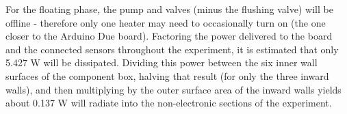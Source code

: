 For the floating phase, the pump and valves (minus the flushing valve) will be offline - therefore only one heater may need to occasionally turn on (the one closer to the Arduino Due board). Factoring the power delivered to the board and the connected sensors throughout the experiment, it is estimated that only 5.427 W will be dissipated. Dividing this power between the six inner wall surfaces of the component box, halving that result (for only the three inward walls), and then multiplying by the outer surface area of the inward walls yields about 0.137 W will radiate into the non-electronic sections of the experiment.